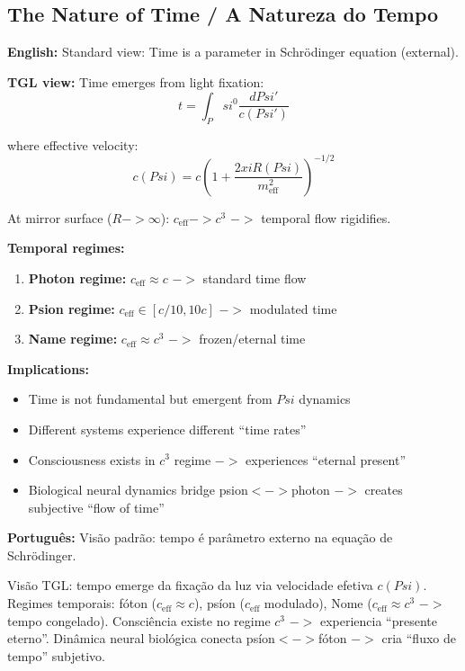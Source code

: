\documentclass[12pt,a4paper]{article}
\def\Psi{Psi}%
\def\to{ -> }%
\def\leftrightarrow{ <-> }%
\def\xi{xi}%
\begin{document}
\subsection{The Nature of Time / A Natureza do Tempo}

\textbf{English:} Standard view: Time is a parameter in Schrödinger equation (external).

\textbf{TGL view:} Time emerges from light fixation:
\begin{equation}
t = \int_\Psi^0 \frac{d\Psi'}{c(\Psi')}
\end{equation}

where effective velocity:
\begin{equation}
c(\Psi) = c\left(1 + \frac{2\xi R(\Psi)}{m_{\text{eff}}^2}\right)^{-1/2}
\end{equation}

At mirror surface ($R \to \infty$): $c_{\text{eff}} \to c^3$ $\to$ temporal flow rigidifies.

\textbf{Temporal regimes:}
\begin{enumerate}
    \item \textbf{Photon regime:} $c_{\text{eff}} \approx c$ $\to$ standard time flow
    \item \textbf{Psion regime:} $c_{\text{eff}} \in [c/10, 10c]$ $\to$ modulated time
    \item \textbf{Name regime:} $c_{\text{eff}} \approx c^3$ $\to$ frozen/eternal time
\end{enumerate}

\textbf{Implications:}
\begin{itemize}
    \item Time is not fundamental but emergent from $\Psi$ dynamics
    \item Different systems experience different ``time rates''
    \item Consciousness exists in $c^3$ regime $\to$ experiences ``eternal present''
    \item Biological neural dynamics bridge psion$\leftrightarrow$photon $\to$ creates subjective ``flow of time''
\end{itemize}

\textbf{Português:} Visão padrão: tempo é parâmetro externo na equação de Schrödinger.

Visão TGL: tempo emerge da fixação da luz via velocidade efetiva $c(\Psi)$. Regimes temporais: fóton ($c_{\text{eff}} \approx c$), psíon ($c_{\text{eff}}$ modulado), Nome ($c_{\text{eff}} \approx c^3$ $\to$ tempo congelado). Consciência existe no regime $c^3$ $\to$ experiencia ``presente eterno''. Dinâmica neural biológica conecta psíon$\leftrightarrow$fóton $\to$ cria ``fluxo de tempo'' subjetivo.
\end{document}
